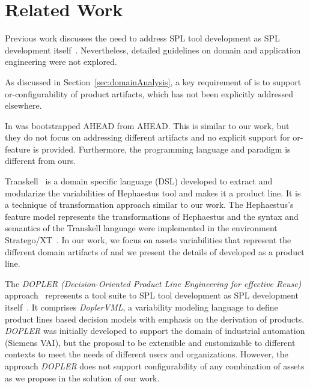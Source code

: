 \section{Related Work}
\label{related-work}


Previous work discusses the need to address SPL tool development as SPL development itself~\citep{grunbacher:2008}. Nevertheless, detailed guidelines on domain and application engineering were not explored.

As discussed in Section~\ref{sec:domainAnalysis}, a key requirement of \hpl{} is to support or-configurability of product artifacts, which has not been explicitly addressed elsewhere.

In \citep{batory-ahead-bootstrap} was bootstrapped AHEAD from AHEAD. This is similar to our work, but they do not focus on addressing different artifacts and no explicit support for or-feature is provided. Furthermore, the programming language and paradigm is different from ours.

Transkell~\citep{marcos:2010} is a domain specific language (DSL) developed to extract and modularize the variabilities of Hephaestus tool and makes it a product line. It is a technique of transformation approach similar to our work.
The Hephaestus’s feature model represents the transformations of Hephaestus and the syntax and semantics of the Transkell language were implemented in the environment Stratego/XT~\citep{visser:2003}. In our work, we focus on assets variabilities that represent the different domain artifacts of \hp{} and we present the details of \hpl{} developed as a product line. 

The \textit{DOPLER (Decision-Oriented Product Line Engineering for effective Reuse)} approach~\citep{DBLP:journals/ase/DhunganaGR11} represents a tool suite to SPL tool development as SPL development itself~\citep{grunbacher:2008}. It comprises \textit{DoplerVML}, a variability modeling language to define product lines based decision models with emphasis on the derivation of products.
\textit{DOPLER} was initially developed to support the domain of industrial automation (Siemens VAI), but the proposal to be extensible and customizable to different contexts to meet the needs of different users and organizations.
However, the approach \textit{DOPLER}  does not support configurability of any combination of assets as we propose in the solution of our work.

